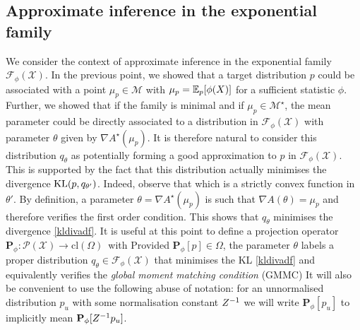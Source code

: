 \subsection{Approximate inference in the exponential family}
%
We consider the context of approximate inference in the exponential family $\mathcal F_{\phi}(\mathcal X)$. In the previous point, we showed that a target distribution $p$ could be associated with a point $\mu_p\in\mathcal M$ with $\mu_p=\mathbb E_{p}[\phi(X)]$ for a sufficient statistic $\phi$. Further, we showed that if the family is minimal and if $\mu_p\in\mathcal M^{\star}$, the mean parameter could be directly associated to a distribution in $\mathcal F_{\phi}(\mathcal X)$ with parameter $\theta$ given by $\nabla A^{\star}(\mu_p)$. It is therefore natural to consider this distribution $q_{\theta}$ as potentially forming a good approximation to $p$ in $\mathcal F_{\phi}(\mathcal X)$.
%
This is supported by the fact that this distribution actually minimises the divergence $\mathrm{KL}\!\left(p,q_{\theta'}\right)$. Indeed, observe that
%
%
which is a strictly convex function in $\theta'$. By definition, a parameter $\theta=\nabla A^{\star}(\mu_p)$ is such that $\nabla A(\theta)=\mu_p$ and therefore verifies the first order condition. This shows that $q_{\theta}$ minimises the divergence \eqref{kldivadf}. It is useful at this point to define a projection operator $\mathbf P_{\phi}:\mathcal P(\mathcal X) \to \mathrm{cl}(\Omega)$\, with
%
%
Provided $\mathbf P_{\phi}[p] \in \Omega$, the parameter $\theta$ labels a proper distribution $q_{\theta}\in\mathcal F_{\phi}(\mathcal X)$ that minimises the KL \eqref{kldivadf} and equivalently verifies the \emph{global moment matching condition} (GMMC) 
%
%
It will also be convenient to use the following abuse of notation: for an unnormalised distribution $p_{u}$ with some normalisation constant $Z^{-1}$ we will write $\mathbf P_{\phi}[p_{u}]$ to implicitly mean $\mathbf P_{\phi}[Z^{-1} p_{u}]$.

